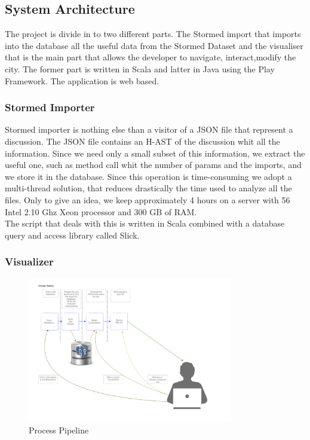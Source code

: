 \documentclass[]{usiinfbachelorproject}
\begin{document}
\newpage



\subsection{System Architecture }
The project is divide in to two different parts. The Stormed import that imports into the database all the useful data from the Stormed Dataset and the visualiser that is the main part  that allows the developer to navigate, interact,modify the city. The former part is written in Scala and latter in Java using the Play Framework. The application is web based. 




\subsubsection{Stormed Importer}
Stormed importer is nothing else than a visitor of a JSON file that represent a discussion. The JSON file contains an H-AST of the discussion whit all the information. Since we need only a small subset of this information, we extract the useful one, such as method call whit the number of params and the imports, and we store it in the database. Since this operation is time-consuming we adopt a multi-thread solution, that reduces drastically the time used to analyze all the files. Only to give an idea, we keep approximately 4 hours on a server with 56 Intel 2.10 Ghz Xeon processor and 300 GB of RAM.\\
The script that deals with this is written in Scala combined with a database query and access library called Slick.


\subsubsection{Visualizer}

\begin{figure}[H]
	\centering
	\includegraphics[width=0.8\textwidth]{images/processPipeline}
	
	\caption[Process Pipeline]{Process Pipeline\label{fig:processPipeline}}

\end{figure}
\end{document}
